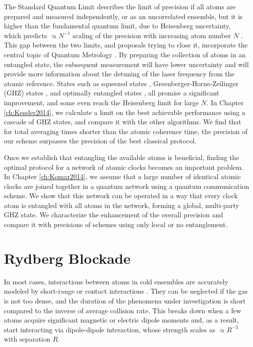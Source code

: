The Standard Quantum Limit describes the limit of precision if all atoms are
prepared and measured independently, or as an uncorrelated ensemble, but it is
higher than the fundamental quantum limit, due to Heisenberg uncertainty, which
predicts $\propto N^{-1}$ scaling of the precision with increasing atom number
$N$ \cite{Hall2012}. This gap between the two limits, and proposals trying to
close it, incorporate the central topic of Quantum Metrology
\cite{Giovanetti2011, Escher:2011fn}. By preparing the collection of atoms in an
entangled state, the subsequent measurement will have lower uncertainty and will
provide more information about the detuning of the laser frequency from the
atomic reference. States such as squeezed states \cite{Andre2004,
Borregaard2013_nearHeisenberg}, Greenberger-Horne-Zeilinger (GHZ) states
\cite{Wineland1998, Bollinger1996}, and optimally entangled states
\cite{Buzek1999, Berry2009}, all promise a significant improvement, and some
even reach the Heisenberg limit for large $N$. In Chapter \ref{ch:Kessler2014},
we calculate a limit on the best achievable performance using a cascade of GHZ
states, and compare it with the other algorithms. We find that for total
averaging times shorter than the atomic coherence time, the precision of our
scheme surpasses the precision of the best classical protocol.

Once we establish that entangling the available atoms is beneficial, finding the
optimal protocol for a network of atomic clocks becomes an important problem. In
Chapter \ref{ch:Komar2014}, we assume that a large number of identical atomic
clocks are joined together in a quantum network using a quantum communication
scheme. We show that this network can be operated in a way that every clock
atom is entangled with all atoms in the network, forming a global, multi-party
GHZ state. We characterize the enhancement of the overall precision and compare
it with precisions of schemes using only local or no entanglement.





\section{Rydberg Blockade}
In most cases, interactions between atoms in cold ensembles are accurately
modeled by short-range or contact interactions \cite{Cheng2010}.
They can be neglected if the gas is not too dense, and the duration of the
phenomena under investigation is short compared to the inverse of average
collision rate. This breaks down when a few atoms acquire significant magnetic
or electric dipole moments and, as a result, start interacting via dipole-dipole
interaction, whose strength scales as $\propto R^{-3}$ with separation $R$.

